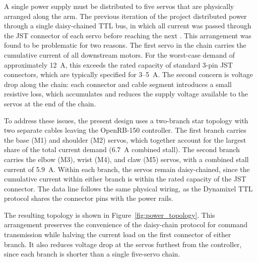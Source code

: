 A single power supply must be distributed to five servos that are 
physically arranged along the arm. The previous iteration of the 
project distributed power through a single daisy-chained TTL bus, 
in which all current was passed through the JST connector of each 
servo before reaching the next \cite{hivemind}. This arrangement was 
found to be problematic for two reasons. The first servo in the 
chain carries the cumulative current of all downstream motors. For 
the worst-case demand of approximately 12~A, this exceeds the rated 
capacity of standard 3-pin JST connectors, which are typically 
specified for 3--5~A. The second concern is voltage drop along the 
chain: each connector and cable segment introduces a small resistive 
loss, which accumulates and reduces the supply voltage available to 
the servos at the end of the chain.

To address these issues, the present design uses a two-branch star 
topology with two separate cables leaving the OpenRB-150 controller. 
The first branch carries the base (M1) and shoulder (M2) servos, 
which together account for the largest share of the total current 
demand (6.7~A combined stall). The second branch carries the elbow 
(M3), wrist (M4), and claw (M5) servos, with a combined stall 
current of 5.9~A. Within each branch, the servos remain 
daisy-chained, since the cumulative current within either branch is 
within the rated capacity of the JST connector. The data line 
follows the same physical wiring, as the Dynamixel TTL protocol 
shares the connector pins with the power rails.

The resulting topology is shown in 
Figure~\ref{fig:power_topology}. This arrangement preserves the 
convenience of the daisy-chain protocol for command transmission 
while halving the current load on the first connector of either 
branch. It also reduces voltage drop at the servos furthest from 
the controller, since each branch is shorter than a single 
five-servo chain.

